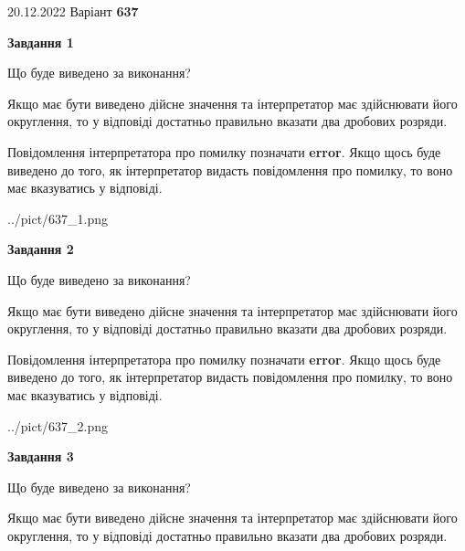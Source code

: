 \documentclass[12pt, ukrainian]{article}
\begin{document}
{20.12.2022 Варіант \No \textbf { 637 }\par}
{
\begin {Large}

{\begin {center}\textbf{Завдання 1}\end {center}}\par
Що буде виведено за виконання? \par

Якщо має бути виведено дійсне значення та інтерпретатор має здійснювати його округлення, 
то у відповіді достатньо правильно вказати два дробових розряди.

Повідомлення інтерпретатора про помилку позначати \textbf{error}.
Якщо щось буде виведено до того, як інтерпретатор видасть повідомлення про помилку, 
то воно має вказуватись у відповіді. \par

\begin{center}
	{../pict/637_1.png}
\end{center}
\newpage

{\begin {center}\textbf{Завдання 2}\end {center}}\par
Що буде виведено за виконання? \par

Якщо має бути виведено дійсне значення та інтерпретатор має здійснювати його округлення, 
то у відповіді достатньо правильно вказати два дробових розряди.

Повідомлення інтерпретатора про помилку позначати \textbf{error}.
Якщо щось буде виведено до того, як інтерпретатор видасть повідомлення про помилку, 
то воно має вказуватись у відповіді. \par

\begin{center}
	{../pict/637_2.png}
\end{center}
\newpage

{\begin {center}\textbf{Завдання 3}\end {center}}\par
Що буде виведено за виконання? \par

Якщо має бути виведено дійсне значення та інтерпретатор має здійснювати його округлення, 
то у відповіді достатньо правильно вказати два дробових розряди.


\end{Large}}
\end{document}
